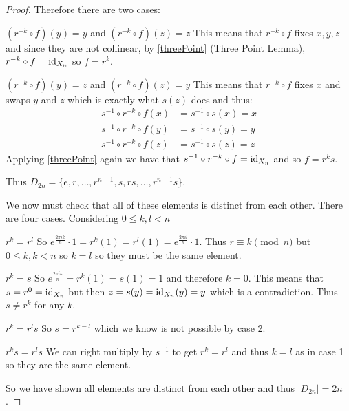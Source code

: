 \documentclass[../main.tex]{subfiles}
\begin{document}
\begin{proof}
  Therefore there are two cases:
  \begin{proofcases}
    \begin{case}{$(r^{-k} \circ f)(y) = y$ and $(r^{-k} \circ f)(z) = z$}
      This means that $r^{-k} \circ f$ fixes $x, y, z$ and since they are not collinear, by \cref{threePoint} (Three Point Lemma), $r^{-k} \circ f = \mathrm{id}_{X_n}$ so $f = r^{k}$.
    \end{case}
    \begin{case}{$(r^{-k} \circ f)(y) = z$ and $(r^{-k} \circ f)(z) = y$}
      This means that $r^{-k} \circ f$ fixes $x$ and swaps $y$ and $z$ which is exactly what $s(z)$ does and thus:
      \begin{align*}
        s^{-1} \circ r^{-k} \circ f(x) &= s^{-1} \circ s(x) = x \\
        s^{-1} \circ r^{-k} \circ f(y) &= s^{-1} \circ s(y) = y \\
        s^{-1} \circ r^{-k} \circ f(z) &= s^{-1} \circ s(z) = z
      \end{align*}
      Applying \cref{threePoint} again we have that $s^{-1} \circ r^{-k} \circ f = \mathrm{id}_{X_n}$ and so $f = r^{k} s$.
    \end{case}
  \end{proofcases}
  Thus $D_{2n} = \{e, r, \ldots, r^{n-1}, s, rs, \ldots, r^{n-1}s\}$.

  We now must check that all of these elements is distinct from each other.
  There are four cases.
  Considering $0 \leq k, l < n$
  \begin{proofcases}
    \begin{case}{$r^{k} = r^{l}$}
      So $e^{\frac{2 \pi i k}{n}} \cdot 1 = r^{k}(1) = r^{l}(1) = e^{\frac{2\pi i l}{n}} \cdot 1$.
      Thus $r \equiv k \pmod{n}$ but $0 \leq k, k < n$ so $k = l$ so they must be the same element.
    \end{case}
    \begin{case}{$r^{k} = s$}
      So $e^{\frac{2 \pi i k}{n}} = r^{k}(1) = s(1) = 1$ and therefore $k = 0$.
      This means that $s = r^{0} = \mathrm{id}_{X_n}$ but then $z = s(y) = \mathrm{id}_{X_n}(y) = y$ which is a contradiction.
      Thus $s \neq r^{k}$ for any $k$.
    \end{case}
    \begin{case}{$r^{k} = r^{l}s$}
      So $s = r^{k - l}$ which we know is not possible by case 2.
    \end{case}
    \begin{case}{$r^{k}s = r^{l}s$}
      We can right multiply by $s^{-1}$ to get $r^{k} = r^{l}$ and thus $k = l$ as in case 1 so they are the same element.
    \end{case}
  \end{proofcases}
  So we have shown all elements are distinct from each other and thus $|D_{2n}| = 2n$.
\end{proof}
\end{document}
